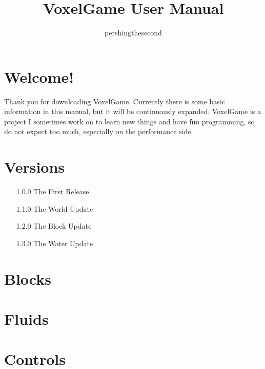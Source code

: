 \documentclass{article}
\begin{document}
    \title{VoxelGame User Manual}
    \author{pershingthesecond}

    \maketitle
    \newpage

    \tableofcontents
    \newpage


    \section{Welcome!}\label{sec:welcome!}

    Thank you for downloading VoxelGame.
    Currently there is some basic information in this manual, but it will be continuously expanded.
    VoxelGame is a project I sometimes work on to learn new things and have fun programming, so do not expect too much, especially on the performance side.


    \section{Versions}\label{sec:versions}

    \begin{enumerate}
        \item[1.0.0] The First Release
        \item[1.1.0] The World Update
        \item[1.2.0] The Block Update
        \item[1.3.0] The Water Update
    \end{enumerate}


    \section{Blocks}\label{sec:blocks}

    


    \section{Fluids}\label{sec:fluids}

    


    \section{Controls}\label{sec:controls}

    
\end{document}
